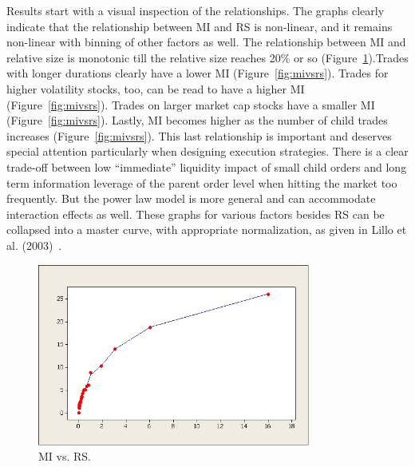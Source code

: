 Results start with a visual inspection of the relationships. The graphs clearly indicate that the relationship between MI and RS is non-linear, and it remains non-linear with binning of other factors as well. The relationship between MI and relative size is monotonic till the relative size reaches 20\% or so (Figure~\ref{fig:miandrsplot}).Trades with longer durations clearly have a lower MI (Figure~\ref{fig:mivsrs}). Trades for higher volatility stocks, too, can be read to have a higher MI (Figure~\ref{fig:mivsrs}). Trades on larger market cap stocks have a smaller MI (Figure~\ref{fig:mivsrs}). Lastly, MI becomes higher as the number of child trades increases (Figure~\ref{fig:mivsrs}). This last relationship is important and deserves special attention particularly when designing execution strategies. There is a clear trade-off between low ``immediate'' liquidity impact of small child orders and long term information leverage of the parent order level when hitting the market too frequently. But the power law model is more general and can accommodate interaction effects as well. These graphs for various factors besides RS can be collapsed into a master curve, with appropriate normalization, as given in Lillo et al. (2003)~\cite{farmermantegna}.
	
	\begin{figure}[!ht]
	\centering
	\includegraphics[width=0.8\textwidth]{chapters/chapter_mi_models/figures/fig3.jpg}
	\caption{MI vs. RS.\label{fig:miandrsplot}}
	\end{figure}

